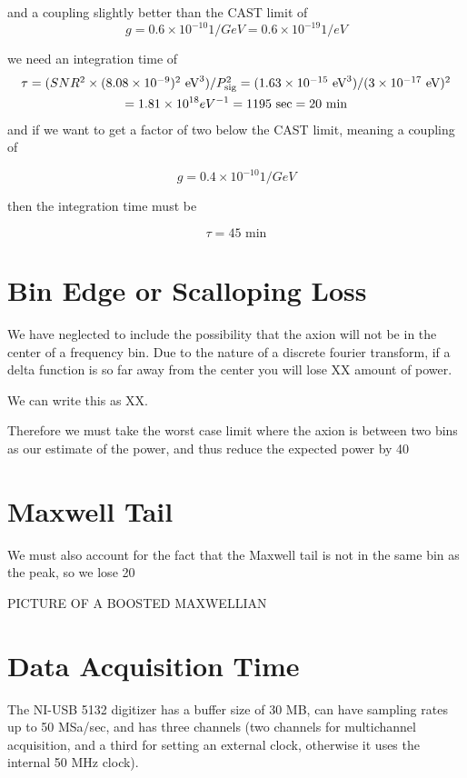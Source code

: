 \documentclass[11pt]{article}
\begin{document}
and a coupling slightly better than the CAST limit of
 $$g = 0.6 \times 10^{-10} 1/GeV = 0.6 \times 10^{-19} 1/eV$$

we need an integration time of 
\begin{multline}
$$\tau = (SNR^2 \times (8.08\times10^{-9})^2 \text{ eV}^3) /P_{\text{sig}}^2= (1.63\times10^{-15} \text{ eV}^3)/(3\times10^{-17}\text{ eV})^2 \\ = 1.81 \times 10^{18} eV^{-1} = 1195\text{ sec} =20\text{ min}$$
\end{multline}
and if we want to get a factor of two below the CAST limit, meaning a coupling of

$$g = 0.4 \times 10^{-10} 1/GeV$$

then the integration time must be

$$\tau = 45\text{ min}$$

\section{Bin Edge or Scalloping Loss}

We have neglected to include the possibility that the axion will not be in the center of a frequency bin. Due to the nature of a discrete fourier transform, if a delta function is so far away from the center you will lose XX amount of power. 

We can write this as XX.

Therefore we must take the worst case limit where the axion is between two bins as our estimate of the power, and thus reduce the expected power by 40%

\section{Maxwell Tail}

We must also account for the fact that the Maxwell tail is not in the same bin as the peak, so we lose 20%

PICTURE OF A BOOSTED MAXWELLIAN



\section{Data Acquisition Time}
The NI-USB 5132 digitizer has a buffer size of 30 MB, can have sampling rates up to 50 MSa/sec, and has three channels (two channels for multichannel acquisition, and a third for setting an external clock, otherwise it uses the internal 50 MHz clock).
\end{document}
